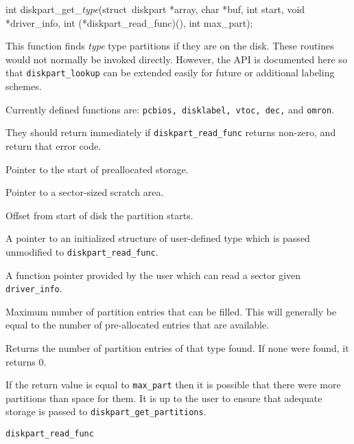 \begin{apisyn}

        \funcproto int diskpart_get_\emph{type}(struct~diskpart *array, 
		char *buf, int start,
                void *driver_info, int (*diskpart_read_func)(),
                int max_part);
\end{apisyn}
\begin{apidesc}
        This function finds \emph{type} type partitions if they are on the disk.
	These routines would not normally be invoked directly.
	However, the API is documented here so that {\tt diskpart_lookup}
	can be extended easily for future or additional labeling schemes.

	Currently defined functions are: {\tt pcbios, disklabel, vtoc, dec,}
	and {\tt omron}.

	They should return immediately if {\tt diskpart_read_func} returns
	non-zero, and return that error code.
\end{apidesc}
\begin{apiparm}
        \item[array]
		Pointer to the start of preallocated storage.
	\item[buf]
		Pointer to a sector-sized scratch area.
	\item[start]
		Offset from start of disk the partition starts.
	\item[driver_info]
                A pointer to an initialized structure of user-defined type
                which is passed unmodified to {\tt diskpart_read_func}.
	\item[diskpart_read_func]
		A function pointer provided by the user which can read
		a sector given {\tt driver_info}.
	\item[max_part]
		Maximum number of partition entries that can be filled.
		This will generally be equal to the number of pre-allocated
		entries that are available.
\end{apiparm}
\begin{apiret}
        Returns the number of partition entries of that type found.
	If none were found, it returns 0.

	If the return value is equal to {\tt max_part} then it is possible
	that there were more partitions than space for them.  It is up to
	the user to ensure that adequate storage is passed to 
	{\tt diskpart_get_partitions}.
\end{apiret}
\begin{apirel}
	{\tt diskpart_read_func}
\end{apirel}
